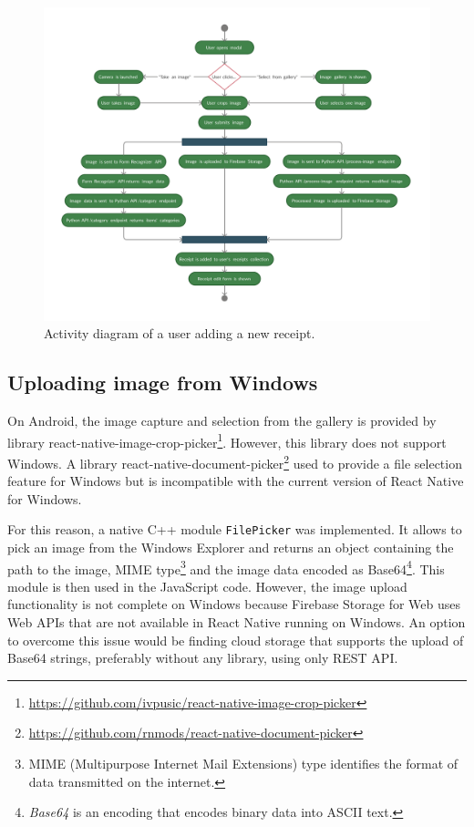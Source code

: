 \documentclass[
  digital, %
  table,   %
  oneside, %
  lof,     %
  lot,     %
]{fithesis3}
\newcommand{\definition}[1]{\textit{#1}}
\begin{document}
\begin{figure}
    \begin{center}
        \includegraphics[width=\textwidth]{figures/diagrams/Add_receipt_Android}
    \end{center}
    \caption{Activity diagram of a user adding a new receipt.}
    \label{fig:add_receipt_android}
\end{figure}

\subsection{Uploading image from Windows}
On Android, the image capture and selection from the gallery is provided by library react-native-image-crop-picker\footnote{\url{https://github.com/ivpusic/react-native-image-crop-picker}}. However, this library does not support Windows. A library react-native-document-picker\footnote{\url{https://github.com/rnmods/react-native-document-picker}} used to provide a file selection feature for Windows but is incompatible with the current version of React Native for Windows. 

For this reason, a native C++ module \texttt{FilePicker} was implemented. It allows to pick an image from the Windows Explorer and returns an object containing the path to the image, MIME type\footnote{MIME (Multipurpose Internet Mail Extensions) type identifies the format of data transmitted on the internet.} and the image data encoded as Base64\footnote{\definition{Base64} is an encoding that encodes binary data into ASCII text.}. This module is then used in the JavaScript code. However, the image upload functionality is not complete on Windows because Firebase Storage for Web uses Web APIs that are not available in React Native running on Windows. An option to overcome this issue would be finding cloud storage that supports the upload of Base64 strings, preferably without any library, using only REST API.
\end{document}
